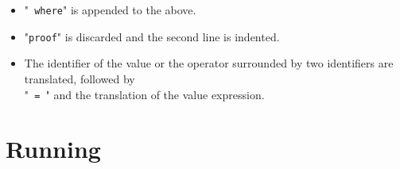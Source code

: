 \documentclass[diploma]{softlab-thesis}
\begin{document}
\begin{itemize}
\begin{itemize}
\item
"\texttt{ where}" is appended to the above.

\item
"\texttt{proof}" is discarded and the second line is indented.

\item
The identifier of the value or the operator surrounded by two identifiers
are translated, followed by \\ "\texttt{ = }" and the translation of the value
expression.

\end{itemize}

\end{itemize}

\newpage
\chapter{Running}
\end{document}
